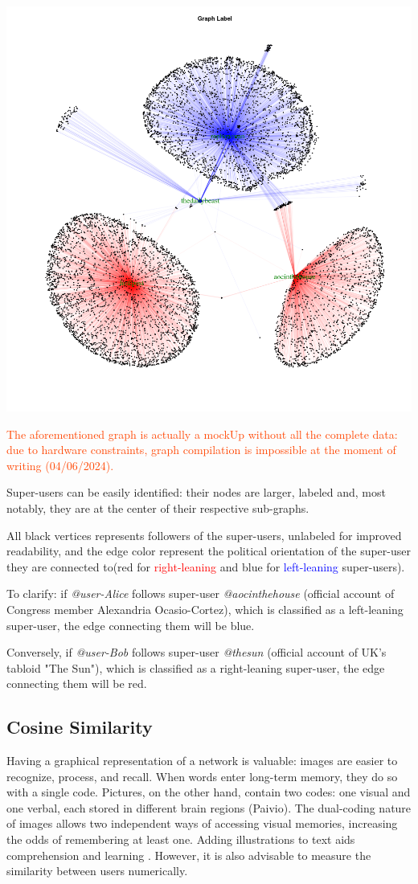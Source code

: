 \aCapo{}
\includegraphics[width = .5\textwidth]{images/mockUP_san.png}

\textcolor{OrangeRed}{The aforementioned graph is actually a mockUp without all the complete data: due to hardware constraints, graph compilation is impossible at the moment of writing (04/06/2024).}

Super-users can be easily identified: their nodes are larger, labeled and, most notably, they are at the center of their respective sub-graphs. 

All black vertices represents followers of the super-users, unlabeled for improved readability, and the edge color represent the political orientation of the super-user they are connected to(red for \textcolor{red}{right-leaning} and blue for \textcolor{blue}{left-leaning} super-users). 

To clarify: if \textit{@user-Alice} follows super-user \textit{@aocinthehouse} (official account of Congress member Alexandria Ocasio-Cortez), which is classified as a left-leaning super-user, the edge connecting them will be blue. 

Conversely, if \textit{@user-Bob} follows super-user \textit{@thesun} (official account of UK's tabloid "The Sun"), which is classified as a right-leaning super-user, the edge connecting them will be red.

\subsection{Cosine Similarity}

Having a graphical representation of a network is valuable: images are easier to recognize, process, and recall. When words enter long-term memory, they do so with a single code. Pictures, on the other hand, contain two codes: one visual and one verbal, each stored in different brain regions (Paivio). The dual-coding nature of images allows two independent ways of accessing visual memories, increasing the odds of remembering at least one. Adding illustrations to text aids comprehension and learning \cite{10.21083/partnership.v10i1.3137}. However, it is also advisable to measure the similarity between users numerically.

